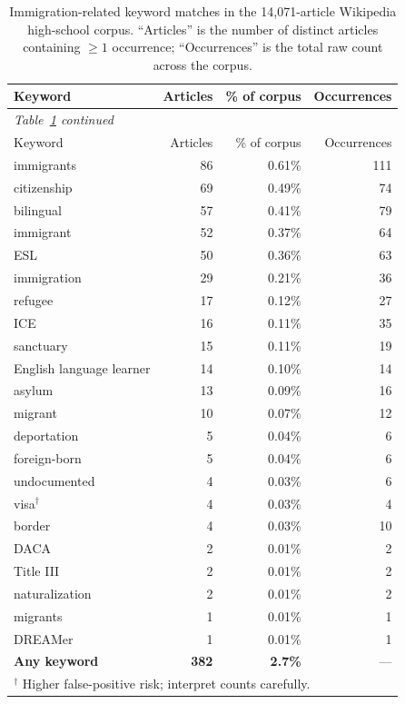 \documentclass[12pt]{article}
\begin{document}
\begin{longtable}{lrrr}
  \caption{Immigration-related keyword matches in the 14{,}071-article Wikipedia high-school corpus. ``Articles'' is the number of distinct articles containing $\geq 1$ occurrence; ``Occurrences'' is the total raw count across the corpus.}
  \label{tab:wiki_immigration_keywords} \\
  \toprule
  Keyword & Articles & \% of corpus & Occurrences \\
  \midrule
  \endfirsthead
  \multicolumn{4}{l}{\small\textit{Table~\ref{tab:wiki_immigration_keywords} continued}} \\[2pt]
  \toprule
  Keyword & Articles & \% of corpus & Occurrences \\
  \midrule
  \endhead
    immigrants               & 86  & 0.61\% & 111 \\
    citizenship              & 69  & 0.49\% &  74 \\
    bilingual                & 57  & 0.41\% &  79 \\
    immigrant                & 52  & 0.37\% &  64 \\
    ESL                      & 50  & 0.36\% &  63 \\
    immigration              & 29  & 0.21\% &  36 \\
    refugee                  & 17  & 0.12\% &  27 \\
    ICE                      & 16  & 0.11\% &  35 \\
    sanctuary                & 15  & 0.11\% &  19 \\
    English language learner & 14  & 0.10\% &  14 \\
    asylum                   & 13  & 0.09\% &  16 \\
    migrant                  & 10  & 0.07\% &  12 \\
    deportation              &  5  & 0.04\% &   6 \\
    foreign-born             &  5  & 0.04\% &   6 \\
    undocumented             &  4  & 0.03\% &   6 \\
    visa$^\dagger$           &  4  & 0.03\% &   4 \\
    border                   &  4  & 0.03\% &  10 \\
    DACA                     &  2  & 0.01\% &   2 \\
    Title III                &  2  & 0.01\% &   2 \\
    naturalization           &  2  & 0.01\% &   2 \\
    migrants                 &  1  & 0.01\% &   1 \\
    DREAMer                  &  1  & 0.01\% &   1 \\
    \midrule
    \textbf{Any keyword}     & \textbf{382} & \textbf{2.7\%} & --- \\
    \bottomrule
    \multicolumn{4}{l}{\footnotesize $^\dagger$ Higher false-positive risk; interpret counts carefully.} \\
\end{longtable}
\end{document}
